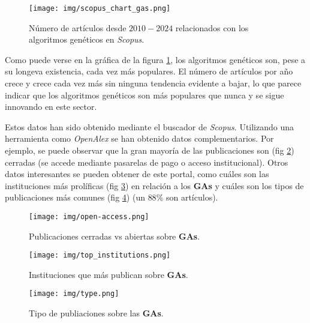 \documentclass[12pt,letterpaper]{article}
\begin{document}
\begin{figure}[htp]
    \centering
    \texttt{[image: img/scopus\_chart\_gas.png]}
    \caption{Número de artículos desde $2010-2024$ relacionados con los algoritmos genéticos en \textit{Scopus}.}
    \label{fig:scopus}
\end{figure}

Como puede verse en la gráfica de la figura \ref{fig:scopus}, los algoritmos genéticos son, pese a su longeva existencia, cada vez más populares. El número de artículos por año crece y crece cada vez más sin ninguna tendencia evidente a bajar, lo que parece indicar que los algoritmos genéticos son más populares que nunca y se sigue innovando en este sector.

Estos datos han sido obtenido mediante el buscador de \textit{Scopus}. Utilizando una herramienta como \textit{OpenAlex} se han obtenido datos complementarios. Por ejemplo, se puede observar que la gran mayoría de las publicaciones son (fig \ref{fig:openalex-closed}) cerradas (se accede mediante pasarelas de pago o acceso institucional). Otros datos interesantes se pueden obtener de este portal, como cuáles son las instituciones más prolíficas (fig \ref{fig:openalex-institutions}) en relación a los \textbf{GAs} y cuáles son los tipos de publicaciones más comunes (fig \ref{fig:openalex-type}) (un $88\%$ son artículos).

\begin{figure}[htp]
    \centering
    \texttt{[image: img/open-access.png]}
    \caption{Publicaciones cerradas vs abiertas sobre \textbf{GAs}.}
    \label{fig:openalex-closed}
\end{figure}

\begin{figure}[htp]
    \centering
    \texttt{[image: img/top\_institutions.png]}
    \caption{Instituciones que más publican sobre \textbf{GAs}.}
    \label{fig:openalex-institutions}
\end{figure}

\begin{figure}[htp]
    \centering
    \texttt{[image: img/type.png]}
    \caption{Tipo de publiaciones sobre las \textbf{GAs}.}
    \label{fig:openalex-type}
\end{figure}
\end{document}

